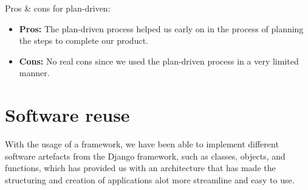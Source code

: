 \documentclass{article}
\begin{document}
Pros \& cons for plan-driven:
\begin{itemize}
    \item \textbf{Pros: }The plan-driven process helped us early on in the process of planning the steps to complete our product. 
    \item \textbf{Cons: }No real cons since we used the plan-driven process in a very limited manner. 
\end{itemize}

\newpage

\section*{Software reuse}

With the usage of a framework, we have been able to implement different software artefacts from the Django framework, such as classes, objects, and functions, which has provided us with an architecture that has made the structuring and creation of applications alot more streamline and easy to use. 
\end{document}
